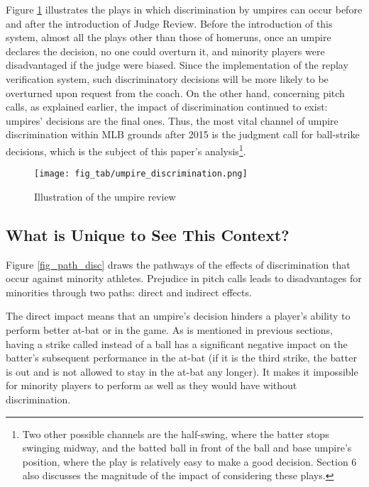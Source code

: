 \documentclass[dvipdfmx, 12pt]{jsarticle}
\begin{document}
Figure \ref{fig_umpire_review} illustrates the plays in which discrimination by umpires can occur before and after the introduction of Judge Review. Before the introduction of this system, almost all the plays other than those of homeruns, once an umpire declares the decision, no one could overturn it, and minority players were disadvantaged if the judge were biased. Since the implementation of the replay verification system, such discriminatory decisions will be more likely to be overturned upon request from the coach. On the other hand, concerning pitch calls, as explained earlier, the impact of discrimination continued to exist: umpires' decisions are the final ones. Thus, the most vital channel of umpire discrimination within MLB grounds after 2015 is the judgment call for ball-strike decisions, which is the subject of this paper's analysis\footnote{Two other possible channels are the half-swing, where the batter stops swinging midway, and the batted ball in front of the ball and base umpire's position, where the play is relatively easy to make a good decision. Section 6 also discusses the magnitude of the impact of considering these plays.}.

\begin{figure}[t]
  \centering
  \caption{Illustration of the umpire review}
  \texttt{[image: fig\_tab/umpire\_discrimination.png]}
  \label{fig_umpire_review}
\end{figure}

\subsection{What is Unique to See This Context?}

Figure \ref{fig_path_disc} draws the pathways of the effects of discrimination that occur against minority athletes. Prejudice in pitch calls leads to disadvantages for minorities through two paths: direct and indirect effects.

The direct impact means that an umpire's decision hinders a player's ability to perform better at-bat or in the game. As is mentioned in previous sections, having a strike called instead of a ball has a significant negative impact on the batter's subsequent performance in the at-bat (if it is the third strike, the batter is out and is not allowed to stay in the at-bat any longer). It makes it impossible for minority players to perform as well as they would have without discrimination.
\end{document}
